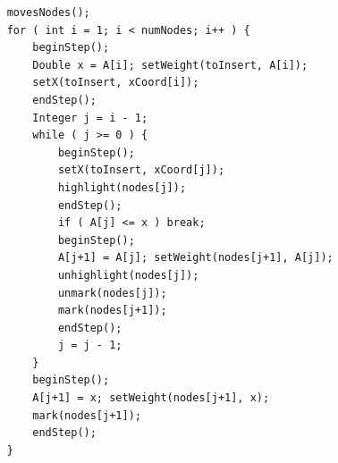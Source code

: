 
\begin{figure}

\begin{center}

\begin{minipage}{4in}
\begin{verbatim}
    movesNodes();
    for ( int i = 1; i < numNodes; i++ ) {
        beginStep();
        Double x = A[i]; setWeight(toInsert, A[i]);
        setX(toInsert, xCoord[i]);
        endStep();
        Integer j = i - 1;
        while ( j >= 0 ) {  
            beginStep();
            setX(toInsert, xCoord[j]);
            highlight(nodes[j]);
            endStep();
            if ( A[j] <= x ) break;
            beginStep();
            A[j+1] = A[j]; setWeight(nodes[j+1], A[j]);
            unhighlight(nodes[j]);
            unmark(nodes[j]);
            mark(nodes[j+1]);
            endStep();
            j = j - 1;
        }
        beginStep();
        A[j+1] = x; setWeight(nodes[j+1], x);
        mark(nodes[j+1]);
        endStep();
    }
\end{verbatim}
\end{minipage}



\end{center}
\end{figure}
